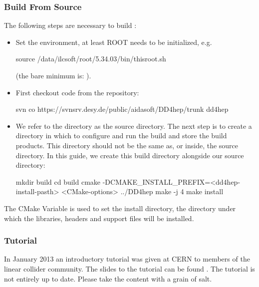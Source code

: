 \documentclass[10pt,a4paper]{article}
\begin{document}
\subsubsection{Build From Source}
\label{sec:dd4hep-user-manual-building-from-source}
\noindent
The following steps are necessary to build \DDhep:
\begin{itemize}
\item Set the environment, at least ROOT needs to be initialized, e.g.
    \begin{unnumberedcode}
      source  /data/ilcsoft/root/5.34.03/bin/thisroot.sh
    \end{unnumberedcode}
    \vspace{-0.6cm}
   (the bare minimum is: ).

\item First checkout code from the repository:
    \begin{unnumberedcode}
      svn co https://svnsrv.desy.de/public/aidasoft/DD4hep/trunk dd4hep
    \end{unnumberedcode}
    \vspace{-0.6cm}

\item We refer to the directory \DDhep as the source directory. The 
next step is to create a directory in which to configure and run the build 
and store the build products. This directory should not be the same as, or 
inside, the source directory. In this guide, we create this build directory 
alongside our source directory: 
    \begin{unnumberedcode}
      mkdir build
      cd build
      cmake -DCMAKE_INSTALL_PREFIX=<dd4hep-install-pasth> <CMake-options> ../DD4hep
      make -j 4
      make install
    \end{unnumberedcode}
\end{itemize}
The CMake Variable  is used to set the install directory, 
the directory under which the \DDhep libraries, headers and support files 
will be installed.

\subsubsection{Tutorial}
\label{sec:dd4hep-user-manual-tutorial}
\noindent
In January 2013 an introductory tutorial was given at CERN to members of the 
linear collider community. The slides to the tutorial can be found 
.
The tutorial is not entirely up to date. Please take the content with a 
grain of salt.
\end{document}
